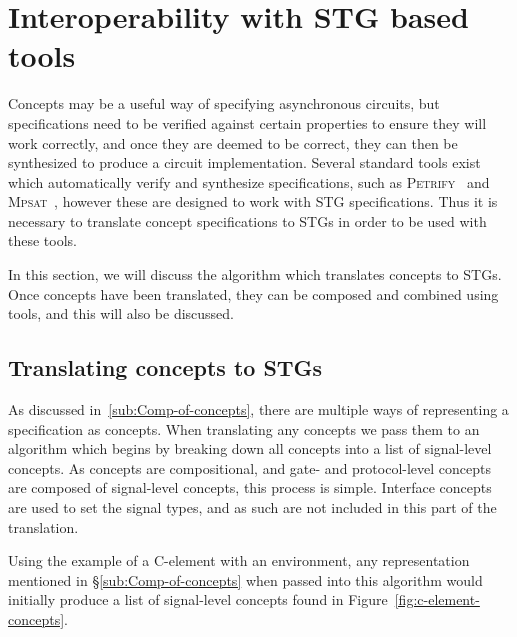 \documentclass[british,compsoc]{IEEEtran}
\newcommand{\noun}[1]{\textsc{#1}}
\begin{document}



\section{Interoperability with STG based tools \label{sec:interop-with-stg}}

Concepts may be a useful way of specifying asynchronous circuits, but specifications need to be verified against certain properties to ensure they will work correctly, and once they are
deemed to be correct, they can then be synthesized to produce a circuit implementation. Several standard tools exist which automatically verify and synthesize specifications, such as
\noun{Petrify}~\cite{Cortadella} and \noun{Mpsat}~\cite{khomenko2004detecting}, however these are designed to work with STG specifications. Thus it is necessary to translate
concept specifications to STGs in order to be used with these tools.

In this section, we will discuss the algorithm which translates concepts to STGs. Once concepts have been translated, they can be composed and combined using tools, and this will also
be discussed.


\subsection{Translating concepts to STGs \label {sub:translating}}

As discussed in~\ref{sub:Comp-of-concepts}, there are multiple ways of representing a specification as concepts.
When translating any concepts we pass them to an algorithm which begins by breaking down all concepts into a list of
signal-level concepts. As concepts are compositional, and gate- and protocol-level concepts are composed of signal-level concepts, this process is simple.
Interface concepts are used to set the signal types, and as such are not included in this part of the translation.

Using the example of a C-element with an environment, any representation mentioned in \S\ref{sub:Comp-of-concepts} when passed into this
algorithm would initially produce a list of signal-level concepts found in Figure~\ref{fig:c-element-concepts}.
\end{document}
